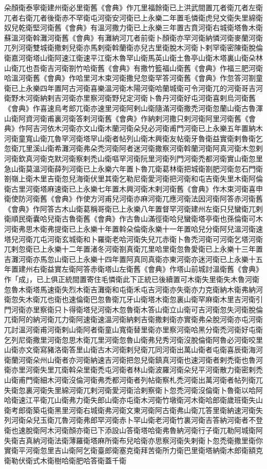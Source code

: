 朵顏衛泰寧衛建州衛必里衛舊《會典》作兀里福餘衛已上洪武間置兀者衛兀者左衛兀者右衛兀者後衛赤不罕衛屯河衛安河衛已上永樂二年置毛憐衛虎兒文衛失里綿衛奴兒乾衛堅河衛舊《會典》有溫河撒力衛已上永樂三年置古賁河衛右城衛塔魯木衛蘇溫河衛斡灘河衛舊《會典》有灘納河兀者前衛卜顏衛亦罕河衛納憐河衛麥蘭河衛兀列河衛雙城衛撒剌兒衛亦馬剌衛斡蘭衛亦兒古里衛脫木河衛卜剌罕衛密陳衛脫倫衛嘉河衛塔山衛阿速江衛速平江衛木魯罕山衛馬英山衛土魯亭山衛木塔裏山衛朵林山衛兀也吾衛吉河衛劄竹哈衛舊《會典》有撒竹籃福山衛舊《會典》作福三肥河衛哈溫河衛舊《會典》作哈里河木束河衛撒兒忽衛罕答河衛舊《會典》作忽答河劄童衛已上永樂四年置阿古河衛喜樂溫河衛木陽河衛哈蘭城衛可令河衛兀的河衛哥吉河衛野木河衛納剌吉河衛亦里察河衛野兒定河衛卜魯丹河衛好屯河衛喜剌烏河衛舊《會典》作喜速烏考郎兀衛亦速里河衛阿剌山衛隨滿河衛撒禿河衛忽蘭山衛古魯渾山衛阿資河衛甫裏河衛答剌河衛舊《會典》作納剌河撒只剌河衛阿里河衛舊《會典》作阿吉河依木河衛亦文山衛木蘭河衛朵兒必河衛甫門河衛已上永樂五年置納木河衛童寬山衛兀魯罕河衛塔罕山衛者帖列山衛木興衛友帖衛牙魯衛益實衛剌魯衛乞忽衛兀里溪山衛希灘河衛弗朵禿河衛阿者迷河衛撒察河衛斡蘭河衛阿真河衛木忽剌河衛欽真河衛克默河衛察剌禿山衛嘔罕河衛阮里河衛列門河衛禿都河衛實山衛忽里急山衛莫溫河衛薛列河衛已上永樂六年置卜魯兀衛葛林衛把城衛劄肥河衛忽石門衛劄嶺上衛木里吉衛忽兒海衛伏里其衛乞勒尼衛愛河衛把河衛和屯吉衛失里木衛阿倫衛古里河衛塔麻速衛已上永樂七年置木興河衛木剌河衛舊《會典》作木束河衛喜申衛使防河衛舊《會典》作使方河甫兒河衛亦麻河衛兀應河衛法因河衛阿答赤河衛舊《會典》作阿答古木山衛葛稱哥衛已上永樂八年置督罕河衛建州左衛只兒蠻衛兀剌衛順民衛囊哈兒衛古魯衛舊《會典》作古魯山滿徑衛哈兒蠻衛塔亭衛也孫倫衛可木河衛弗思木衛弗提衛已上永樂十年置斡朵倫衛永樂十一年置哈兒分衛阿兒溫河衛速塔兒河衛兀屯河衛玄城衛和卜羅衛老哈河衛失兒兀赤衛卜魯禿河衛可河衛乞塔河衛兀剌忽衛已上永樂十二年置渚冬河衛劄真衛兀里哈里衛忽魯愛衛已上永樂十三年置吉灘河衛亦馬忽山衛已上永樂十四年置阿真同真衛亦東河衛亦迷河衛已上永樂十五年置建州右衛益實左衛阿答赤衛塔山左衛舊《會典》作塔山前城討溫衛舊《會典》作「成」，已上俱正統間置寄住毛憐衛此下正統已後續置可木衛失里衛失木魯河衛忽魯木衛塔馬速衛失烈木衛吉灘衛和屯衛禾屯吉河衛亦失衛亦力克衛納木衛弗納河衛忽失木衛兀也衛也速倫衛巴忽魯衛兀牙山衛塔木衛忽裏山衛罕麻衛木里吉河衛引門河衛亦里察衛只卜得衛塔兒河衛木忽魯衛木答山衛立山衛可吉河衛忽失河衛脫倫兀衛阿的納河衛兀力衛阿速衛速溫河衛納剌吉衛撒剌衛亦實衛弗朵脫河衛亦屯河衛兀討溫河衛甫河衛剌山衛阿者衛童山寬衛替里衛亦里察河衛哈黑分衛禿河衛好屯衛乞列尼衛撒里河衛忽思木衛兀里河衛忽魯山衛弗兒秀河衛沒脫倫衛阿魯必河衛咬里山衛亦文衛寫豬洛衛答里山衛古木河衛剌兒衛兀同河衛出萬山衛者屯衛喜辰衛海河衛蘭河衛朵州山衛者亦河衛納速吉河衛把忽兒衛鎮真河衛也速河衛者剌禿衛也魯河衛亦里河衛失里兀衛斡朵里衛禿屯河衛者林山衛波羅河衛朵兒平河衛散力衛密剌禿山衛甫門衛細木河衛沒倫河衛弗禿都河衛者列帖衛察札禿河衛出萬河衛者帖列衛兀失衛忽裏河衛失里綿河衛兀剌河衛愛河衛洽剌察衛卜忽禿河衛沒倫衛卜魯衛以哈阿哈衛速江平衛兀山衛弗力衛失郎山衛亦屯衛木河衛竹墩衛河木衛哈郎衛歲班衛失山衛考郎衛築屯衛黑里河衛右城衛弗河衛文東河衛阿古衛弗山衛兀答里衛納速河衛失列河衛朵兒玉衛兀魯河衛弗郎罕河衛赤卜罕山衛老河衛竹裏河衛吉答納河衛者不登衛也速脫衛阿木河衛顏亦衛已下添設山答衛塔哈衛弗魯納河衛行子衛兀勒阿城衛阿失衛吉真納河衛法衛薄羅衛塔麻所衛布兒哈衛亦思察河衛失剌衛卜忽禿衛撒里衛你實衛平河衛忽里吉山衛阿乞衛臺郎衛塞克衛拜苦衛所力衛巴里衛塔納衛木郎衛額克衛勒伏衛式木衛樹哈衛肥哈答衛蓋千衛


